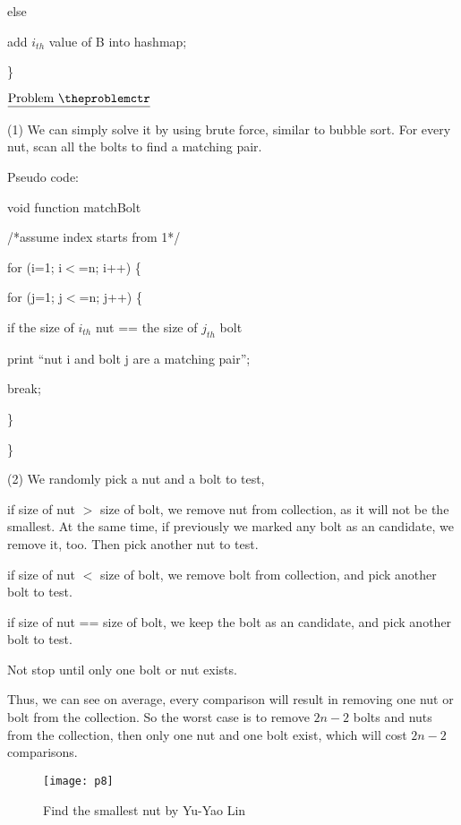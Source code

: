 \documentclass[11pt]{article}
\def\pp{\par\noindent}
\begin{document}
	\hspace{1.0 cm}else
		
		\hspace{1.5 cm}add $i_{th}$ value of B into hashmap;

\}

\vfill
\newpage
\addtocounter{problemctr}{1}
\bigskip
\noindent
$\underline{\rm Problem\ \theproblemctr}$\pp

\noindent
(1) We can simply solve it by using brute force, similar to bubble sort. For every nut, scan all the bolts to find a matching pair.

Pseudo code:

void function matchBolt

/*assume index starts from 1*/

for (i=1; i$<$=n; i++) \{
	
	\hspace{.5 cm}for (j=1; j$<$=n; j++) \{

		\hspace{1.0 cm}if the size of $i_{th}$ nut == the size of $j_{th}$ bolt

			\hspace{1.5 cm}print ``nut i and bolt j are a matching pair'';

			\hspace{1.5 cm}break;

	\hspace{.5 cm}\}

\}

\bigskip
\bigskip
\noindent
(2) We randomly pick a nut and a bolt to test,

if size of nut $>$ size of bolt, we remove nut from collection, as it will not be the smallest. At the same time, if previously we marked any bolt as an candidate, we remove it, too. Then pick another nut to test.

if size of nut $<$ size of bolt, we remove bolt from collection, and pick another bolt to test.

if size of nut == size of bolt, we keep the bolt as an candidate, and pick another bolt to test.

Not stop until only one bolt or nut exists.

Thus, we can see on average, every comparison will result in removing one nut or bolt from the collection. So the worst case is to remove $2n-2$ bolts and nuts from the collection, then only one nut and one bolt exist, which will cost $2n-2$ comparisons.

\begin{figure} [htpb]
\centering
\texttt{[image: p8]}
\caption{Find the smallest nut by Yu-Yao Lin}
\end{figure}
\end{document}
